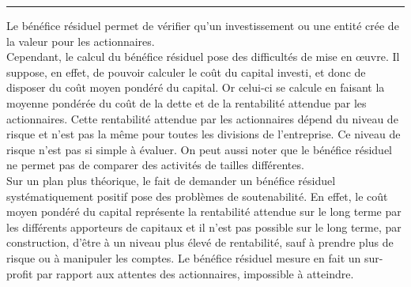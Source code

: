 \documentclass{tufte-handout}
\begin{document}
\begin{enumerate}
\noindent\rule{\textwidth}{0.5pt}

Le bénéfice résiduel permet de vérifier qu'un investissement ou une entité crée de la valeur pour les actionnaires.\\

Cependant, le calcul du bénéfice résiduel pose des difficultés de mise en œuvre. Il suppose, en effet, de pouvoir calculer le coût du capital investi, et donc de disposer du coût moyen pondéré du capital. Or celui-ci se calcule en faisant la moyenne pondérée du coût de la dette et de la rentabilité attendue par les actionnaires. Cette rentabilité attendue par les actionnaires dépend du niveau de risque et n'est pas la même pour toutes les divisions de l'entreprise. Ce niveau de risque n'est pas si simple à évaluer. On peut aussi noter que le bénéfice résiduel ne permet pas de comparer des activités de tailles différentes.\\

Sur un plan plus théorique, le fait de demander un bénéfice résiduel systématiquement positif pose des problèmes de soutenabilité. En effet, le coût moyen pondéré du capital représente la rentabilité attendue sur le long terme par les différents apporteurs de capitaux et il n'est pas possible sur le long terme, par construction, d'être à un niveau plus élevé de rentabilité, sauf à prendre plus de risque ou à manipuler les comptes. Le bénéfice résiduel mesure en fait un sur-profit par rapport aux attentes des actionnaires, impossible à atteindre.\\
\end{enumerate}
\end{document}
